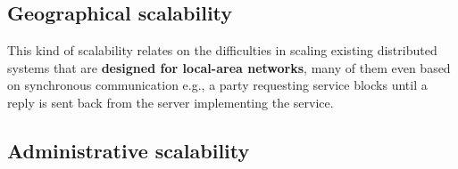 \subsection{Geographical scalability}

This kind of scalability relates on the difficulties in scaling existing distributed systems that are \textbf{designed for local-area networks}, many of them even based on synchronous communication e.g., a party requesting service blocks until a reply is sent back from the server implementing the service.


\subsection{Administrative scalability}


